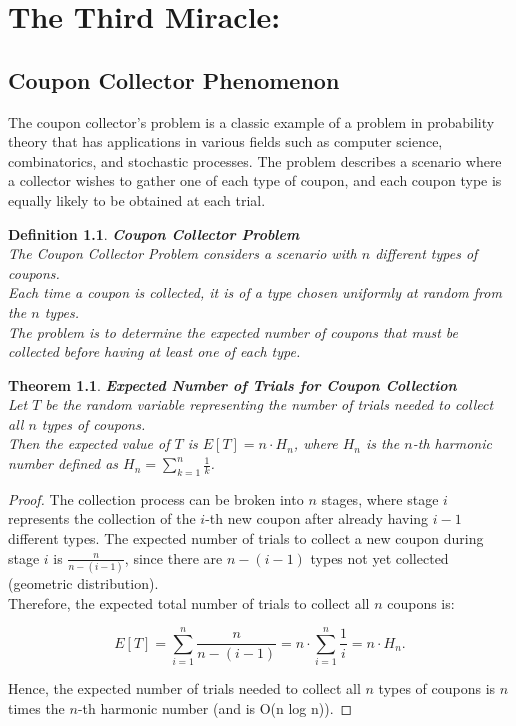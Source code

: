 \documentclass[11pt]{book} %
\newtheorem{theorem}{Theorem}[section]
\newtheorem{definition}{Definition}[section]
\begin{document}
\chapter{The Third Miracle: }

\section{Coupon Collector Phenomenon}

The coupon collector's problem is a classic example of a problem in probability theory that has applications in various fields such as computer science, 
combinatorics, and stochastic processes. 
The problem describes a scenario where a collector wishes to gather one of each type of coupon, 
and each coupon type is equally likely to be obtained at each trial.

\begin{definition}{\textbf{Coupon Collector Problem}} \\
The \emph{Coupon Collector Problem} considers a scenario with \( n \) different types of coupons.  \\
Each time a coupon is collected, it is of a type chosen uniformly at random from the \( n \) types. \\
The problem is to determine the expected number of coupons that must be collected before having at least one of each type.
\end{definition}

\begin{theorem}{\textbf{Expected Number of Trials for Coupon Collection}} \\
Let \( T \) be the random variable representing the number of trials needed to collect all \( n \) types of coupons. \\ 
Then the expected value of \( T \) is \( E[T] = n \cdot H_n \), where \( H_n \) is the \( n \)-th harmonic number defined as \( H_n = \sum_{k=1}^{n} \frac{1}{k} \).
\end{theorem}

\begin{proof}
The collection process can be broken into \( n \) stages, where stage \( i \) represents the collection of the \( i \)-th new coupon after already
having \( i-1 \) different types. The expected number of trials to collect a new coupon during stage \( i \) is \( \frac{n}{n - (i - 1)} \), 
since there are \( n - (i - 1) \) types not yet collected (geometric distribution). \\ 
Therefore, the expected total number of trials to collect all \( n \) coupons is:

\[
E[T] = \sum_{i=1}^{n} \frac{n}{n - (i - 1)} = n \cdot \sum_{i=1}^{n} \frac{1}{i} = n \cdot H_n.
\]

Hence, the expected number of trials needed to collect all \( n \) types of coupons is \( n \) times the \( n \)-th harmonic number (and is O(n log n)).
\end{proof}
\end{document}
